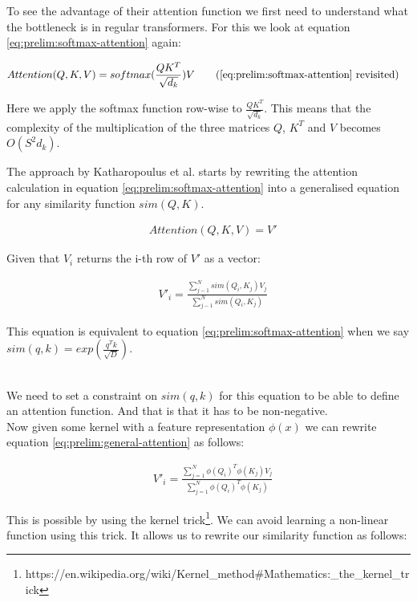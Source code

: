 To see the advantage of their attention function we first need to understand what the bottleneck is in regular transformers. For this we look at equation \ref{eq:prelim:softmax-attention} again:

\begin{align}
&Attention(Q, K, V) = softmax(\frac{QK^T} {\sqrt{d_k}})V
\tag{\ref{eq:prelim:softmax-attention} revisited}
\end{align}

Here we apply the softmax function row-wise to $\frac{QK^T} {\sqrt{d_k}}$. This means that the complexity of the multiplication of the three matrices $Q$, $K^T$ and $V$ becomes $O(S^2 d_k)$.

The approach by Katharopoulus et al. starts by rewriting the attention calculation in equation \ref{eq:prelim:softmax-attention} into a generalised equation for any similarity function $sim(Q, K)$.

\begin{align}
&Attention(Q, K, V) = V'
\end{align}

Given that $V_i$ returns the i-th row of $V'$ as a vector:

\begin{align}
&V'_i =\frac{\sum_{j-1} ^{N} sim(Q_i, K_j) V_j}{\sum_{j-1} ^{N} sim(Q_i, K_j)}
\label{eq:prelim:general-attention}
\end{align}

This equation is equivalent to equation \ref{eq:prelim:softmax-attention} when we say $sim(q, k) = exp(\frac{q^Tk}{\sqrt{D}})$.

\\We need to set a constraint on $sim(q, k)$ for this equation to be able to define an attention function. And that is that it has to be non-negative.\\

Now given some kernel with a feature representation $\phi(x)$ we can rewrite equation \ref{eq:prelim:general-attention} as follows:

\begin{align}
    &V'_i = \frac{\sum_{j=1}^{N} \phi(Q_i)^T\phi(K_j)V_j}{\sum_{j=1}^{N} \phi(Q_i)^T\phi(K_j)}
    \label{eq:prelim:lin-att-1}
\end{align}

This is possible by using the kernel trick\footnote{https://en.wikipedia.org/wiki/Kernel_method#Mathematics:_the_kernel_trick}. We can avoid learning a non-linear function using this trick. It allows us to rewrite our similarity function as follows:

